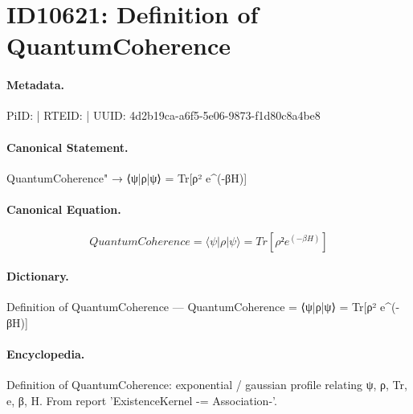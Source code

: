 \section*{ID10621: Definition of QuantumCoherence}
\paragraph{Metadata.}
PiID:  | RTEID:  | UUID: 4d2b19ca-a6f5-5e06-9873-f1d80c8a4be8

\paragraph{Canonical Statement.}
QuantumCoherence" → ⟨ψ|ρ|ψ⟩ = Tr[ρ² e\textasciicircum{}(-βH)]

\paragraph{Canonical Equation.}
\[
QuantumCoherence = ⟨ψ|ρ|ψ⟩ = Tr[ρ² e^(-βH)]
\]

\paragraph{Dictionary.}
Definition of QuantumCoherence — QuantumCoherence = ⟨ψ|ρ|ψ⟩ = Tr[ρ² e\textasciicircum{}(-βH)]

\paragraph{Encyclopedia.}
Definition of QuantumCoherence: exponential / gaussian profile relating ψ, ρ, Tr, e, β, H. From report 'ExistenceKernel -= Association-'.
